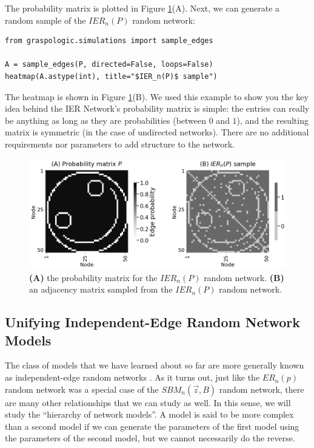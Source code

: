 The probability matrix is plotted in Figure \ref{fig:ch5:ier}(A). Next, we can generate a random sample of the $IER_n(P)$ random network:

\begin{lstlisting}[style=python]
from graspologic.simulations import sample_edges

A = sample_edges(P, directed=False, loops=False)
heatmap(A.astype(int), title="$IER_n(P)$ sample")
\end{lstlisting}

The heatmap is shown in Figure \ref{fig:ch5:ier}(B). We used this example to show you the key idea behind the IER Network's probability matrix is simple: the entries can really be anything as long as they are probabilities (between $0$ and $1$), and the resulting matrix is symmetric (in the case of undirected networks). There are no additional requirements nor parameters to add structure to the network.

\begin{figure}
    \centering
    \includegraphics[width=\linewidth]{representations/ch5/Images/ier.png}
    \caption[$IER_n(P)$ parameters]{\textbf{(A)} the probability matrix for the $IER_n(P)$ random network. \textbf{(B)} an adjacency matrix sampled from the $IER_n(P)$ random network.}
    \label{fig:ch5:ier}
\end{figure}

\subsection{Unifying Independent-Edge Random Network Models}

The class of models that we have learned about so far are more generally known as independent-edge random networks \cite{Athreya2017Jan}. As it turns out, just like the $ER_n(p)$ random network was a special case of the $SBM_n(\vec z, B)$ random network, there are many other relationships that we can study as well. In this sense, we will study the ``hierarchy of network models''. A model is said to be more complex than a second model if we can generate the parameters of the first model using the parameters of the second model, but we cannot necessarily do the reverse.

